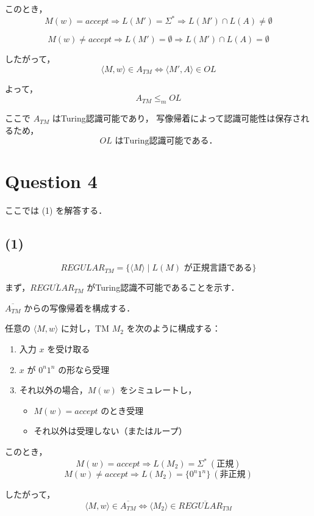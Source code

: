 \documentclass[a4paper,11pt]{ltjsarticle}
\begin{document}
このとき，
\[
M(w)=accept \Rightarrow L(M')=\Sigma^*
\Rightarrow L(M') \cap L(A) \neq \emptyset
\]

\[
M(w)\neq accept \Rightarrow L(M')=\emptyset
\Rightarrow L(M') \cap L(A) = \emptyset
\]

したがって，
\[
\langle M,w\rangle \in A_{TM}
\iff
\langle M',A\rangle \in OL
\]

よって，
\[
A_{TM} \leq_m OL
\]

ここで $A_{TM}$ はTuring認識可能であり，
写像帰着によって認識可能性は保存されるため，
\[
OL \text{ はTuring認識可能である．}
\]

\section*{Question 4}

ここでは (1) を解答する．

\subsection*{(1)}

\[
REGULAR_{TM} = \{ \langle M \rangle \mid L(M) \text{ が正規言語である} \}
\]

まず，$\overline{REGULAR_{TM}}$ がTuring認識不可能であることを示す．

$\overline{A_{TM}}$ からの写像帰着を構成する．

任意の $\langle M,w\rangle$ に対し，TM $M_2$ を次のように構成する：
\begin{enumerate}
    \item 入力 $x$ を受け取る
    \item $x$ が $0^n1^n$ の形なら受理
    \item それ以外の場合，$M(w)$ をシミュレートし，
    \begin{itemize}
        \item $M(w)=accept$ のとき受理
        \item それ以外は受理しない（またはループ）
    \end{itemize}
\end{enumerate}

このとき，
\[
M(w)=accept \Rightarrow L(M_2)=\Sigma^* \ (\text{正規})
\]
\[
M(w)\neq accept \Rightarrow L(M_2)=\{0^n1^n\} \ (\text{非正規})
\]

したがって，
\[
\langle M,w\rangle \in \overline{A_{TM}}
\iff
\langle M_2 \rangle \in \overline{REGULAR_{TM}}
\]
\end{document}
